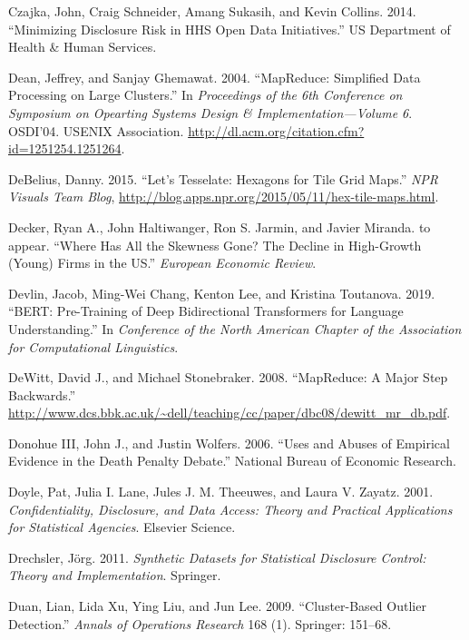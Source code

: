 \documentclass[]{krantz}
\begin{document}
\hypertarget{ref-czajka2014minimizing}{}
Czajka, John, Craig Schneider, Amang Sukasih, and Kevin Collins. 2014.
``Minimizing Disclosure Risk in HHS Open Data Initiatives.'' US
Department of Health \& Human Services.

\hypertarget{ref-MapReduce}{}
Dean, Jeffrey, and Sanjay Ghemawat. 2004. ``MapReduce: Simplified Data
Processing on Large Clusters.'' In \emph{Proceedings of the 6th
Conference on Symposium on Opearting Systems Design \&
Implementation---Volume 6}. OSDI'04. USENIX Association.
\url{http://dl.acm.org/citation.cfm?id=1251254.1251264}.

\hypertarget{ref-DeBelius2015}{}
DeBelius, Danny. 2015. ``Let's Tesselate: Hexagons for Tile Grid Maps.''
\emph{NPR Visuals Team Blog},
\url{http://blog.apps.npr.org/2015/05/11/hex-tile-maps.html}.

\hypertarget{ref-decker2015has}{}
Decker, Ryan A., John Haltiwanger, Ron S. Jarmin, and Javier Miranda. to
appear. ``Where Has All the Skewness Gone? The Decline in High-Growth
(Young) Firms in the US.'' \emph{European Economic Review}.

\hypertarget{ref-devlin-18}{}
Devlin, Jacob, Ming-Wei Chang, Kenton Lee, and Kristina Toutanova. 2019.
``BERT: Pre-Training of Deep Bidirectional Transformers for Language
Understanding.'' In \emph{Conference of the North American Chapter of
the Association for Computational Linguistics}.

\hypertarget{ref-MapReduceBad}{}
DeWitt, David J., and Michael Stonebraker. 2008. ``MapReduce: A Major
Step Backwards.''
\url{http://www.dcs.bbk.ac.uk/~dell/teaching/cc/paper/dbc08/dewitt_mr_db.pdf}.

\hypertarget{ref-donohue2006uses}{}
Donohue III, John J., and Justin Wolfers. 2006. ``Uses and Abuses of
Empirical Evidence in the Death Penalty Debate.'' National Bureau of
Economic Research.

\hypertarget{ref-doyle2001confidentiality}{}
Doyle, Pat, Julia I. Lane, Jules J. M. Theeuwes, and Laura V. Zayatz.
2001. \emph{Confidentiality, Disclosure, and Data Access: Theory and
Practical Applications for Statistical Agencies}. Elsevier Science.

\hypertarget{ref-drechsler2011synthetic}{}
Drechsler, Jörg. 2011. \emph{Synthetic Datasets for Statistical
Disclosure Control: Theory and Implementation}. Springer.

\hypertarget{ref-duan2009cluster}{}
Duan, Lian, Lida Xu, Ying Liu, and Jun Lee. 2009. ``Cluster-Based
Outlier Detection.'' \emph{Annals of Operations Research} 168 (1).
Springer: 151--68.
\end{document}
